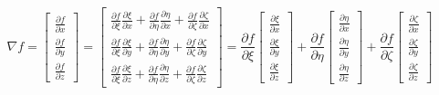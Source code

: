 \documentclass
[
a4paper,                      %
twoside,					  %
12pt,                         %
abstract,		      %
fleqn,                        %
]
{scrartcl} %
\begin{document}
\begin{description}
\begin{equation}
\nabla f=\begin{bmatrix}
\frac{\partial f}{\partial x}\\[5pt]
\frac{\partial f}{\partial y}\\[5pt]
\frac{\partial f}{\partial z}
\end{bmatrix}=\begin{bmatrix}
\frac{\partial f}{\partial\xi}\frac{\partial\xi}{\partial x}+\frac{\partial f}{\partial\eta}\frac{\partial\eta}{\partial x}+\frac{\partial f}{\partial\zeta}\frac{\partial\zeta}{\partial x}\\[5pt]
\frac{\partial f}{\partial\xi}\frac{\partial\xi}{\partial y}+\frac{\partial f}{\partial\eta}\frac{\partial\eta}{\partial y}+\frac{\partial f}{\partial\zeta}\frac{\partial\zeta}{\partial y}\\[5pt]
\frac{\partial f}{\partial\xi}\frac{\partial\xi}{\partial z}+\frac{\partial f}{\partial\eta}\frac{\partial\eta}{\partial z}+\frac{\partial f}{\partial\zeta}\frac{\partial\zeta}{\partial z}
\end{bmatrix}=\frac{\partial f}{\partial\xi}\begin{bmatrix}
\frac{\partial\xi}{\partial x}\\[5pt]
\frac{\partial\xi}{\partial y}\\[5pt]
\frac{\partial\xi}{\partial z}\end{bmatrix}+\frac{\partial f}{\partial\eta}\begin{bmatrix}
\frac{\partial\eta}{\partial x}\\[5pt]
\frac{\partial\eta}{\partial y}\\[5pt]
\frac{\partial\eta}{\partial z}\end{bmatrix}+\frac{\partial f}{\partial\zeta}\begin{bmatrix}
\frac{\partial\zeta}{\partial x}\\[5pt]
\frac{\partial\zeta}{\partial y}\\[5pt]
\frac{\partial\zeta}{\partial z}
\end{bmatrix}
\end{equation}


\end{description}
\end{document}
